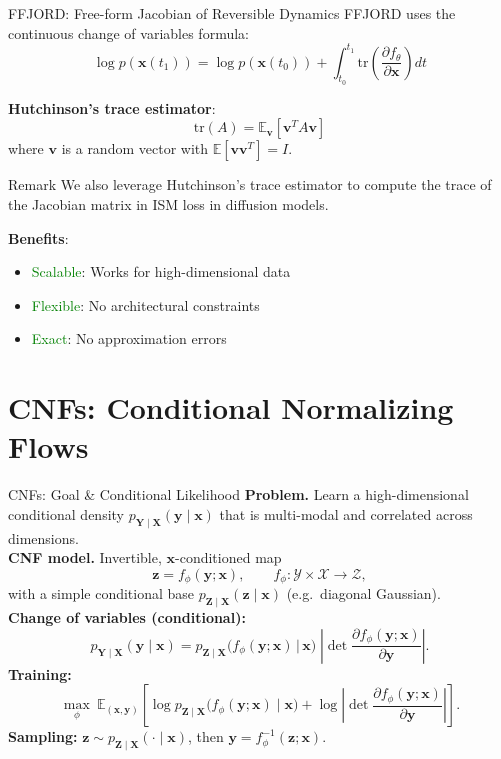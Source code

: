 \documentclass[aspectratio=169]{beamer}
\begin{document}
\begin{frame}{FFJORD: Free-form Jacobian of Reversible Dynamics}
FFJORD uses the continuous change of variables formula:
\begin{equation}
    \log p(\mathbf{x}(t_1)) = \log p(\mathbf{x}(t_0)) + \int_{t_0}^{t_1} \text{tr}\left(\frac{\partial f_\theta}{\partial \mathbf{x}}\right) dt
\end{equation}

\textbf{Hutchinson's trace estimator}:
\begin{equation}
    \text{tr}(A) = \mathbb{E}_{\mathbf{v}}[\mathbf{v}^T A \mathbf{v}]
\end{equation}
where $\mathbf{v}$ is a random vector with $\mathbb{E}[\mathbf{v}\mathbf{v}^T] = I$.

\begin{alertblock}{Remark}
    We also leverage Hutchinson's trace estimator to compute the trace of the Jacobian matrix in ISM loss in diffusion models.
\end{alertblock}

\textbf{Benefits}:
\begin{itemize}
    \item \textcolor{green}{Scalable}: Works for high-dimensional data
    \item \textcolor{green}{Flexible}: No architectural constraints
    \item \textcolor{green}{Exact}: No approximation errors
\end{itemize}
\end{frame}

\section{CNFs: Conditional Normalizing Flows}
\begin{frame}{CNFs: Goal \& Conditional Likelihood}
\textbf{Problem.} Learn a high-dimensional conditional density $p_{\mathbf{Y}\mid \mathbf{X}}(\mathbf{y}\mid \mathbf{x})$ that is multi-modal and correlated across dimensions.\\[4pt]

\textbf{CNF model.} Invertible, $\mathbf{x}$-conditioned map
\[
\mathbf{z} = f_\phi(\mathbf{y}; \mathbf{x}), \qquad f_\phi:\mathcal{Y}\times \mathcal{X}\to \mathcal{Z},
\]
with a simple conditional base $p_{\mathbf{Z}\mid \mathbf{X}}(\mathbf{z}\mid \mathbf{x})$ (e.g.\ diagonal Gaussian).\\[6pt]

\textbf{Change of variables (conditional):}
\[
p_{\mathbf{Y}\mid \mathbf{X}}(\mathbf{y}\mid \mathbf{x})
= p_{\mathbf{Z}\mid \mathbf{X}}\!\big(f_\phi(\mathbf{y};\mathbf{x})\,\big|\,\mathbf{x}\big)\;
\left|\det \frac{\partial f_\phi(\mathbf{y};\mathbf{x})}{\partial \mathbf{y}}\right|.
\]
\textbf{Training:}
\[
\max_\phi~ \mathbb{E}_{(\mathbf{x},\mathbf{y})}\!\left[
\log p_{\mathbf{Z}\mid \mathbf{X}}\!\big(f_\phi(\mathbf{y};\mathbf{x})\mid \mathbf{x}\big)
+ \log \left| \det \frac{\partial f_\phi(\mathbf{y};\mathbf{x})}{\partial \mathbf{y}} \right|
\right].
\]
\textbf{Sampling:} $\mathbf{z}\!\sim\! p_{\mathbf{Z}\mid \mathbf{X}}(\cdot\mid \mathbf{x})$, then $\mathbf{y}= f_\phi^{-1}(\mathbf{z};\mathbf{x})$.
\end{frame}
\end{document}

